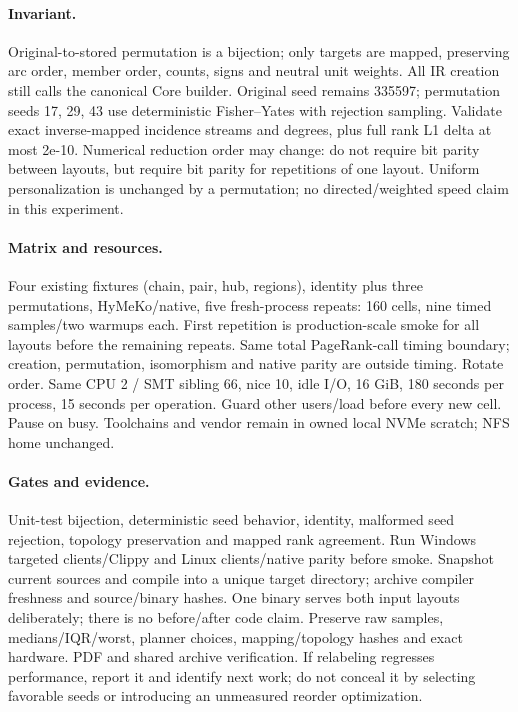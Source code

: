 \documentclass[11pt,a4paper]{article}
\begin{document}
\paragraph{Invariant.} Original-to-stored permutation is a bijection; only targets are
mapped, preserving arc order, member order, counts, signs and neutral unit weights.
All IR creation still calls the canonical Core builder. Original seed remains 335597;
permutation seeds 17, 29, 43 use deterministic Fisher--Yates with rejection sampling.
Validate exact inverse-mapped incidence streams and degrees, plus full rank L1 delta
at most 2e-10. Numerical reduction order may change: do not require bit parity between
layouts, but require bit parity for repetitions of one layout. Uniform personalization
is unchanged by a permutation; no directed/weighted speed claim in this experiment.
\paragraph{Matrix and resources.} Four existing fixtures (chain, pair, hub, regions),
identity plus three permutations, HyMeKo/native, five fresh-process repeats: 160 cells,
nine timed samples/two warmups each. First repetition is production-scale smoke for
all layouts before the remaining repeats. Same total PageRank-call timing boundary;
creation, permutation, isomorphism and native parity are outside timing. Rotate order.
Same CPU 2 / SMT sibling 66, nice 10, idle I/O, 16 GiB, 180 seconds per process,
15 seconds per operation. Guard other users/load before every new cell. Pause on busy.
Toolchains and vendor remain in owned local NVMe scratch; NFS home unchanged.
\paragraph{Gates and evidence.} Unit-test bijection, deterministic seed behavior,
identity, malformed seed rejection, topology preservation and mapped rank agreement.
Run Windows targeted clients/Clippy and Linux clients/native parity before smoke.
Snapshot current sources and compile into a unique target directory; archive compiler
freshness and source/binary hashes. One binary serves both input layouts deliberately;
there is no before/after code claim. Preserve raw samples, medians/IQR/worst, planner
choices, mapping/topology hashes and exact hardware. PDF and shared archive verification.
If relabeling regresses performance, report it and identify next work; do not conceal it
by selecting favorable seeds or introducing an unmeasured reorder optimization.
\end{document}
